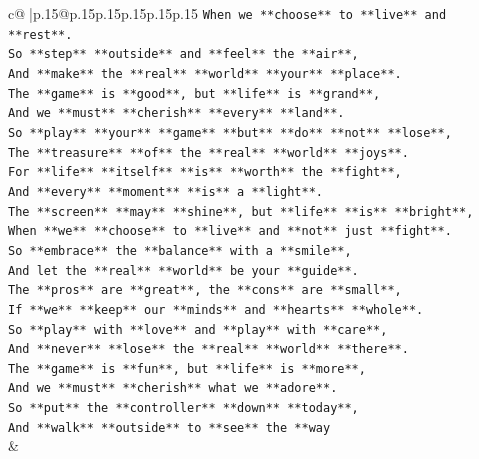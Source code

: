 \documentclass{article}
\begin{document}
{\begin{supertabular}{c@{$\;$}|p{.15\linewidth}@{}p{.15\linewidth}p{.15\linewidth}p{.15\linewidth}p{.15\linewidth}p{.15\linewidth}}
{{{\texttt{When we **choose** to **live** and **rest**.} \\
\texttt{So **step** **outside** and **feel** the **air**,} \\
\texttt{And **make** the **real** **world** **your** **place**.} \\
\texttt{The **game** is **good**, but **life** is **grand**,} \\
\texttt{And we **must** **cherish** **every** **land**.} \\
\texttt{So **play** **your** **game** **but** **do** **not** **lose**,} \\
\texttt{The **treasure** **of** the **real** **world** **joys**.} \\
\texttt{For **life** **itself** **is** **worth** the **fight**,} \\
\texttt{And **every** **moment** **is** a **light**.} \\
\texttt{The **screen** **may** **shine**, but **life** **is** **bright**,} \\
\texttt{When **we** **choose** to **live** and **not** just **fight**.} \\
\texttt{So **embrace** the **balance** with a **smile**,} \\
\texttt{And let the **real** **world** be your **guide**.} \\
\texttt{The **pros** are **great**, the **cons** are **small**,} \\
\texttt{If **we** **keep** our **minds** and **hearts** **whole**.} \\
\texttt{So **play** with **love** and **play** with **care**,} \\
\texttt{And **never** **lose** the **real** **world** **there**.} \\
\texttt{The **game** is **fun**, but **life** is **more**,} \\
\texttt{And we **must** **cherish** what we **adore**.} \\
\texttt{So **put** the **controller** **down** **today**,} \\
\texttt{And **walk** **outside** to **see** the **way} \\
            }
        }
    }
    & \\ \\


\end{supertabular}}
\end{document}

